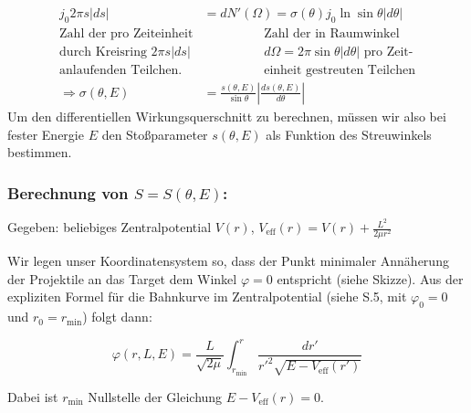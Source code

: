 \documentclass[10pt, letterpaper]{article}
\begin{document}
$$
\begin{aligned}
j_0 2 \pi s|d s| &= dN'(\Omega) = \sigma(\theta) j_0 \ln \sin \theta|d \theta| \\
\text{Zahl der pro Zeiteinheit} & \hspace{2cm} \text{Zahl der in Raumwinkel} \\
\text{durch Kreisring } 2\pi s|ds| & \hspace{2cm} d\Omega=2\pi\sin\theta |d\theta| \text{ pro Zeit-} \\
\text{anlaufenden Teilchen.} & \hspace{2cm} \text{einheit gestreuten Teilchen} \\[1ex]
\Rightarrow \sigma(\theta,E) &= \frac{s(\theta,E)}{\sin\theta} \left|\frac{ds(\theta,E)}{d\theta}\right|
\end{aligned}
$$
Um den differentiellen Wirkungsquerschnitt zu berechnen, müssen wir also bei fester Energie $E$ den Stoßparameter $s(\theta,E)$ als Funktion des Streuwinkels bestimmen.



\subsubsection{Berechnung von $S=S(\theta,E)$:}

\begin{center}
\end{center}

Gegeben: beliebiges Zentralpotential $V(r)$, $V_{\text{eff}}(r)=V(r)+\frac{L^2}{2\mu r^2}$

Wir legen unser Koordinatensystem so, dass der Punkt minimaler Annäherung der Projektile an das Target dem Winkel $\varphi=0$ entspricht (siehe Skizze). Aus der expliziten Formel für die Bahnkurve im Zentralpotential (siehe S.5, mit $\varphi_0=0$ und $r_0=r_{\text{min}}$) folgt dann:

\[ \varphi(r,L,E)= \frac{L}{\sqrt{2\mu}} \int_{r_{\text{min}}}^r \frac{dr'}{r'^2\sqrt{E-V_{\text{eff}}(r')}} \]

Dabei ist $r_{\text{min}}$ Nullstelle der Gleichung $E-V_{\text{eff}}(r)=0$.
\end{document}

